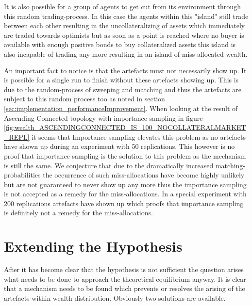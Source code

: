 \documentclass[Bachelorarbeit.tex]{subfiles}
\begin{document}
\medskip 

It is also possible for a group of agents to get cut from its environment through this random trading-process. In this case the agents within this "island" still trade between each other resulting in the uncollateralizing of assets which immediately are traded towards optimists but as soon as a point is reached where no buyer is available with enough positive bonds to buy collateralized assets this island is also incapable of trading any more resulting in an island of miss-allocated wealth.

\medskip 

An important fact to notice is that the artefacts must not necessarily show up. It is possible for a single run to finish without these artefacts showing up. This is due to the random-process of sweeping and matching and thus the artefacts are subject to this random process too as noted in section \ref{sec:implementation_performanceImprovement}. When looking at the result of Ascending-Connected topology with importance sampling in figure \ref{fig:wealth_ASCENDINGCONNECTED_IS_100_NOCOLLATERALMARKET_REPL} it seems that Importance sampling elevates this problem as no artefacts have shown up during an experiment with 50 replications. This however is no proof that importance sampling is the solution to this problem as the mechanism is still the same. We conjecture that due to the dramatically increased matching-probabilities the occurrence of such miss-allocations have become highly unlikely but are not guaranteed to never show up any more thus the importance sampling is not accepted as a remedy for the miss-allocations. In a special experiment with 200 replications artefacts have shown up which proofs that importance sampling is definitely not a remedy for the miss-allocations.

\section{Extending the Hypothesis}
After it has become clear that the hypothesis is not sufficient the question arises what needs to be done to approach the theoretical equilibrium anyway. It is clear that a mechanism needs to be found which prevents or resolves the arising of the artefacts within wealth-distribution. Obviously two solutions are available.
\end{document}
